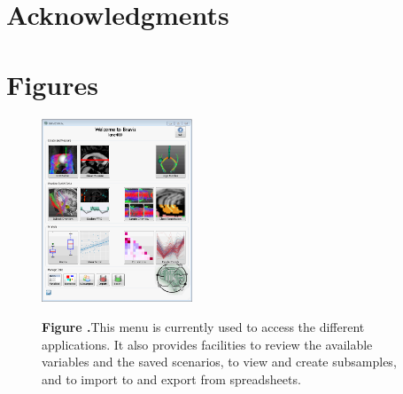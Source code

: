 \documentclass[utf8,paper]{frontiersSCNS} %
\begin{document}
\section*{Acknowledgments}

\section*{Figures}

\begin{figure}[h!]
\begin{center}
\includegraphics[width=0.4\textwidth]{figures/braviz_menu.PNG}
\end{center}
 \textbf{\label{fig_menu} Figure .}{This menu is currently used to access the different applications. It also provides facilities to review the available variables and the saved scenarios, to view and create subsamples, and to import to and export from spreadsheets.  }
\end{figure}
\end{document}
